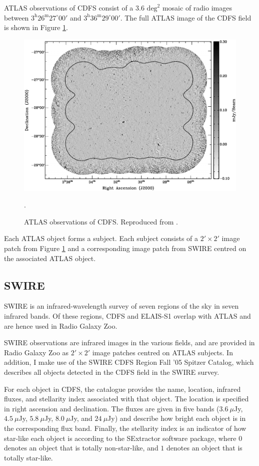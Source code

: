 \documentclass[a4paper]{article}
\newcommand{\fig}{Figure }
\begin{document}
      ATLAS observations of CDFS consist of a $3.6 \text{ deg}^2$ mosaic of radio images between $3^\text{h}26^\text{m} 27^\circ 00'$ and $3^\text{h}36^\text{m} 29^\circ 00'$. The full ATLAS image of the CDFS field is shown in \fig \ref{fig:cdfs}.

      \begin{figure}[!ht]
        \centering
        \includegraphics[width=0.8\linewidth,]{images/ATLAS-CDFS-cropped.pdf}
        \caption{ATLAS observations of CDFS. Reproduced from \citet{franzen15}.}.
        \label{fig:cdfs}
      \end{figure}

      Each ATLAS object forms a subject. Each subject consists of a $2' \times 2'$ image patch from \fig \ref{fig:cdfs} and a corresponding image patch from SWIRE centred on the associated ATLAS object.

    \subsection{SWIRE}

      SWIRE is an infrared-wavelength survey of seven regions of the sky in seven infrared bands. Of these regions, CDFS and ELAIS-S1 overlap with ATLAS and are hence used in Radio Galaxy Zoo.

      SWIRE observations are infrared images in the various fields, and are provided in Radio Galaxy Zoo as $2' \times 2'$ image patches centred on ATLAS subjects. In addition, I make use of the SWIRE CDFS Region Fall '05 Spitzer Catalog\cite{surace05}, which describes all objects detected in the CDFS field in the SWIRE survey.

      For each object in CDFS, the catalogue provides the name, location, infrared fluxes, and stellarity index associated with that object. The location is specified in right ascension and declination. The fluxes are given in five bands ($3.6\ \mu$Jy, $4.5\ \mu$Jy, $5.8\ \mu$Jy, $8.0\ \mu$Jy, and $24\ \mu$Jy) and describe how bright each object is in the corresponding flux band. Finally, the stellarity index is an indicator of how star-like each object is according to the SExtractor software package, where $0$ denotes an object that is totally non-star-like, and $1$ denotes an object that is totally star-like\cite{surace05}.
\end{document}
